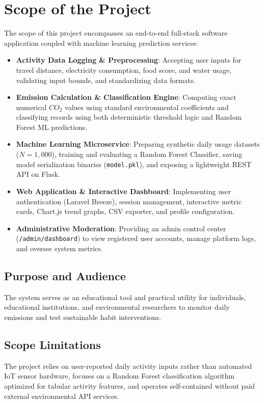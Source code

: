 \documentclass[12pt,a4paper]{report}
\begin{document}
\section{Scope of the Project}
The scope of this project encompasses an end-to-end full-stack software application coupled with machine learning prediction services:
\begin{itemize}
    \item \textbf{Activity Data Logging \& Preprocessing}: Accepting user inputs for travel distance, electricity consumption, food score, and water usage, validating input bounds, and standardizing data formats.
    \item \textbf{Emission Calculation \& Classification Engine}: Computing exact numerical $CO_2$ values using standard environmental coefficients and classifying records using both deterministic threshold logic and Random Forest ML predictions.
    \item \textbf{Machine Learning Microservice}: Preparing synthetic daily usage datasets ($N=1,000$), training and evaluating a Random Forest Classifier, saving model serialization binaries (\texttt{model.pkl}), and exposing a lightweight REST API on Flask.
    \item \textbf{Web Application \& Interactive Dashboard}: Implementing user authentication (Laravel Breeze), session management, interactive metric cards, Chart.js trend graphs, CSV exporter, and profile configuration.
    \item \textbf{Administrative Moderation}: Providing an admin control center (\texttt{/admin/dashboard}) to view registered user accounts, manage platform logs, and oversee system metrics.
\end{itemize}

\subsection{Purpose and Audience}
The system serves as an educational tool and practical utility for individuals, educational institutions, and environmental researchers to monitor daily emissions and test sustainable habit interventions.

\subsection{Scope Limitations}
The project relies on user-reported daily activity inputs rather than automated IoT sensor hardware, focuses on a Random Forest classification algorithm optimized for tabular activity features, and operates self-contained without paid external environmental API services.
\end{document}
